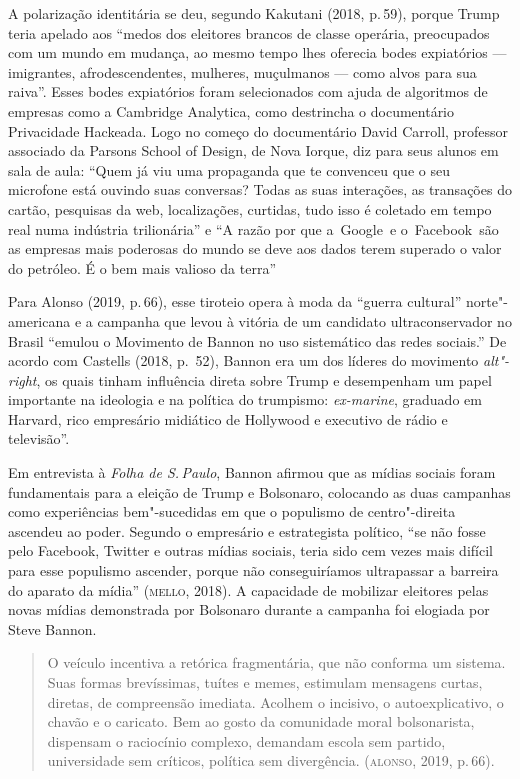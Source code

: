 
A polarização identitária se deu, segundo Kakutani (2018, p.\,59), porque
Trump teria apelado aos ``medos dos eleitores brancos de classe
operária, preocupados com um mundo em mudança, ao mesmo tempo lhes
oferecia bodes expiatórios --- imigrantes, afrodescendentes, mulheres,
muçulmanos --- como alvos para sua raiva''. Esses bodes expiatórios foram
selecionados com ajuda de algoritmos de empresas como a Cambridge
Analytica, como destrincha o documentário Privacidade Hackeada. Logo no
começo do documentário David Carroll, professor associado da Parsons
School of Design, de Nova Iorque, diz para seus alunos em sala
de aula: ``Quem já viu uma propaganda que te convenceu que o seu
microfone está ouvindo suas conversas? Todas as suas interações, as
transações do cartão, pesquisas da web, localizações, curtidas, tudo
isso é coletado em tempo real numa indústria trilionária'' e ``A razão por
que a~Google~e o~Facebook~são as empresas mais poderosas do mundo se
deve aos dados terem superado o valor do petróleo. É o bem mais valioso
da terra''

Para Alonso (2019, p.\,66), esse tiroteio opera à moda da ``guerra
cultural'' norte"-americana e a campanha que levou à vitória de um
candidato ultraconservador no Brasil ``emulou o Movimento de Bannon no
uso sistemático das redes sociais.'' De acordo com Castells (2018, p.\,
52), Bannon era um dos líderes do movimento \textit{alt"-right}, os quais
tinham influência direta sobre Trump e desempenham um papel importante
na ideologia e na política do trumpismo: \textit{ex-marine}, graduado em
Harvard, rico empresário midiático de Hollywood e executivo de rádio e
televisão''.

Em entrevista à \textit{Folha de S.\,Paulo}, Bannon afirmou que as mídias
sociais foram fundamentais para a eleição de Trump e Bolsonaro,
colocando as duas campanhas como experiências bem"-sucedidas em que o
populismo de centro"-direita ascendeu ao poder. Segundo o empresário e
estrategista político, ``se não fosse pelo Facebook, Twitter e outras
mídias sociais, teria sido cem vezes mais difícil para esse populismo
ascender, porque não conseguiríamos ultrapassar a barreira do aparato da
mídia'' (\textsc{mello}, 2018). A capacidade de mobilizar eleitores pelas novas
mídias demonstrada por Bolsonaro durante a campanha foi elogiada por
Steve Bannon.

\begin{quote}
O veículo incentiva a retórica fragmentária, que não conforma um
sistema. Suas formas brevíssimas, tuítes e memes, estimulam mensagens
curtas, diretas, de compreensão imediata. Acolhem o incisivo, o
autoexplicativo, o chavão e o caricato. Bem ao gosto da comunidade moral
bolsonarista, dispensam o raciocínio complexo, demandam escola sem
partido, universidade sem críticos, política sem divergência. (\textsc{alonso},
2019, p.\,66).
\end{quote}

